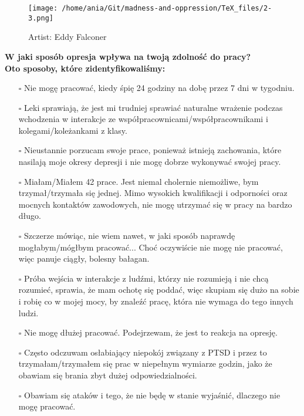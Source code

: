 \newpage
\begin{figure}[h]
\centering
\texttt{[image: /home/ania/Git/madness-and-oppression/TeX\_files/2-3.png]}
\caption{Artist: Eddy Falconer}
\label{2-2}
\end{figure}

\noindent\textcolor{ProcessBlue}{\textbf{\Large{W jaki sposób opresja wpływa na twoją zdolność do pracy?}}}\\
\textbf{\large{Oto sposoby, które zidentyfikowaliśmy:}}
\begin{multicols}{2}
\begin{itemize}
\item[$\square$]{Nie mogę pracować, kiedy śpię 24 godziny na dobę przez 7 dni w tygodniu.}
\item[$\square$]{Leki sprawiają, że jest mi trudniej sprawiać naturalne wrażenie podczas wchodzenia w interakcje ze współpracownicami/współpracownikami i kolegami/koleżankami z klasy.}
\item[$\square$]{Nieustannie porzucam swoje prace, ponieważ istnieją zachowania, które nasilają moje okresy depresji i nie mogę dobrze wykonywać swojej pracy.}
\item[$\square$]{Miałam/Miałem 42 prace. Jest niemal cholernie niemożliwe, bym trzymał/trzymała się jednej. Mimo wysokich kwalifikacji i odporności oraz mocnych kontaktów zawodowych, nie mogę utrzymać się w pracy na bardzo długo.}
\item[$\square$]{Szczerze mówiąc, nie wiem nawet, w jaki sposób naprawdę mogłabym/mógłbym pracować... Choć oczywiście nie mogę nie pracować, więc panuje ciągły, bolesny bałagan.}
\item[$\square$]{Próba wejścia w interakcje z ludźmi, którzy nie rozumieją i nie chcą rozumieć, sprawia, że mam ochotę się poddać, więc skupiam się dużo na sobie i robię co w mojej mocy, by znaleźć pracę, która nie wymaga do tego innych ludzi.}
\item[$\square$]{Nie mogę dłużej pracować. Podejrzewam, że jest to reakcja na opresję.}
\item[$\square$]{Często odczuwam osłabiający niepokój związany z PTSD i przez to trzymałam/trzymałem się prac w niepełnym wymiarze godzin, jako że obawiam się brania zbyt dużej odpowiedzialności.}
\item[$\square$]{Obawiam się ataków i tego, że nie będę w stanie wyjaśnić, dlaczego nie mogę pracować.}
\end{itemize}
\end{multicols}


